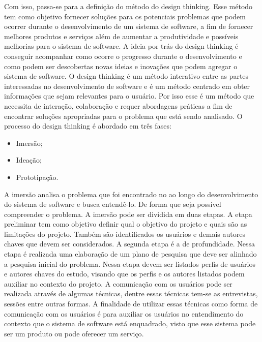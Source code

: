 \documentclass[a4paper,twoside]{article}
\begin{document}
Com isso, passa-se para a definição do método do design thinking.
Esse método tem como objetivo fornecer soluções para os potenciais problemas que podem ocorrer durante o desenvolvimento de um sistema de software, a fim de fornecer melhores produtos e serviços além de aumentar a produtividade e possíveis melhorias para o sistema de software. A ideia por trás do design thinking é conseguir acompanhar como ocorre o progresso durante o desenvolvimento e como podem ser descobertas novas ideias e inovações que podem agregar o sistema de software. O design thinking é um método interativo entre as partes interessadas no desenvolvimento de software e é um método centrado em obter informações que sejam relevantes para o usuário. Por isso esse é um método que necessita de interação, colaboração e requer abordagens práticas a fim de encontrar soluções apropriadas para o problema que está sendo analisado. O processo do design thinking é abordado em três fases\cite{Definicao}\cite{DBLP:journals/information/MartinsJCKPO19}:
\begin{itemize}
    \item Imersão;
    \item Ideação;
    \item Prototipação.
\end{itemize}

A imersão analisa o problema que foi encontrado no ao longo do desenvolvimento do sistema de software e busca entendê-lo. De forma que seja possível compreender o problema. A imersão pode ser dividida em duas etapas. A etapa preliminar tem como objetivo definir qual o objetivo do projeto e quais são as limitações do projeto. Também são identificados os usuários e demais autores chaves que devem ser considerados. A segunda etapa é a de profundidade. Nessa etapa é realizada uma elaboração de um plano de pesquisa que deve ser alinhado a pesquisa inicial do problema. Nessa etapa devem ser listados perfis de usuários e autores chaves do estudo, visando que os perfis e os autores listados podem auxiliar no contexto do projeto. A comunicação com os usuários pode ser realizada através de algumas técnicas, dentre essas técnicas tem-se as entrevistas, sessões entre outras formas. A finalidade de utilizar essas técnicas como forma de comunicação com os usuários é para auxiliar os usuários no entendimento do contexto que o sistema de software está enquadrado, visto que esse sistema pode ser um produto ou pode oferecer um serviço\cite{DBLP:journals/information/MartinsJCKPO19}.
\end{document}
